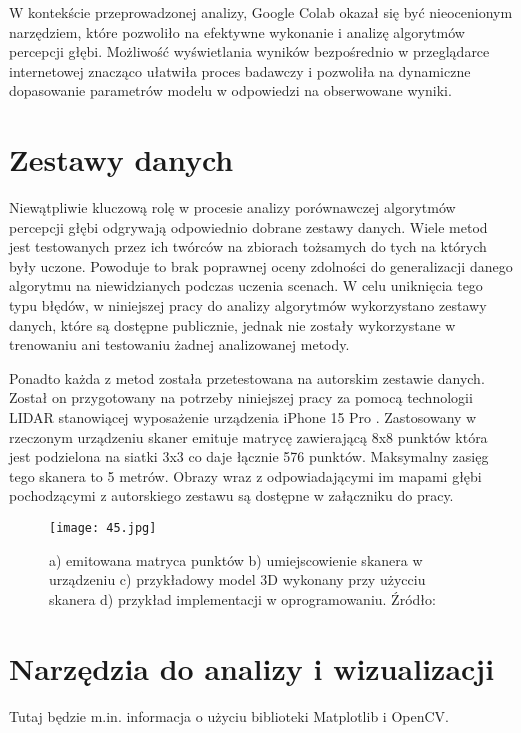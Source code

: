 W kontekście przeprowadzonej analizy, Google Colab okazał się być nieocenionym narzędziem, które pozwoliło na efektywne wykonanie i analizę algorytmów percepcji głębi. Możliwość wyświetlania wyników bezpośrednio w przeglądarce internetowej znacząco ułatwiła proces badawczy i pozwoliła na dynamiczne dopasowanie parametrów modelu w odpowiedzi na obserwowane wyniki.

\section{Zestawy danych}
Niewątpliwie kluczową rolę w procesie analizy porównawczej algorytmów percepcji głębi odgrywają odpowiednio dobrane zestawy danych. Wiele metod jest testowanych przez ich twórców na zbiorach tożsamych do tych na których były uczone. Powoduje to brak poprawnej oceny zdolności do generalizacji danego algorytmu na niewidzianych podczas uczenia scenach. W celu uniknięcia tego typu błędów, w niniejszej pracy do analizy algorytmów wykorzystano zestawy danych, które są dostępne publicznie, jednak nie zostały wykorzystane w trenowaniu ani testowaniu żadnej analizowanej metody.

Ponadto każda z metod została przetestowana na autorskim zestawie danych. Został on przygotowany na potrzeby niniejszej pracy za pomocą technologii LIDAR stanowiącej wyposażenie urządzenia iPhone 15 Pro \cite{chase2022apple}. Zastosowany w rzeczonym urządzeniu skaner emituje matrycę zawierającą 8x8 punktów która jest podzielona na siatki 3x3 co daje łącznie 576 punktów. Maksymalny zasięg tego skanera to 5 metrów. Obrazy wraz z odpowiadającymi im mapami głębi pochodzącymi z autorskiego zestawu są dostępne w załączniku do pracy.
\begin{figure}[H]
    \centering
    \texttt{[image: 45.jpg]}
    \caption{a) emitowana matryca punktów b) umiejscowienie skanera w urządzeniu c) przykładowy model 3D wykonany przy użycciu skanera d) przykład implementacji w oprogramowaniu. Źródło: \cite{luetzenburg2021evaluation}}
    \label{fig:adelaidepth}
\end{figure}

\section{Narzędzia do analizy i wizualizacji}
Tutaj będzie m.in. informacja o użyciu biblioteki Matplotlib i OpenCV.
